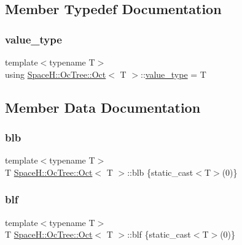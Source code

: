 \subsection{Member Typedef Documentation}
\mbox{\label{struct_space_h_1_1_oc_tree_1_1_oct_a41cf6a021264a323ca727e1a261202d7}} 
\subsubsection{\texorpdfstring{value\+\_\+type}{value\_type}}
{\footnotesize\ttfamily template$<$typename T$>$ \\
using \mbox{\hyperlink{struct_space_h_1_1_oc_tree_1_1_oct}{Space\+H\+::\+Oc\+Tree\+::\+Oct}}$<$ T $>$\+::\mbox{\hyperlink{struct_space_h_1_1_oc_tree_1_1_oct_a41cf6a021264a323ca727e1a261202d7}{value\+\_\+type}} =  T}



\subsection{Member Data Documentation}
\mbox{\label{struct_space_h_1_1_oc_tree_1_1_oct_a5686b8a8af2a730540161b5df01e9fd8}} 
\subsubsection{\texorpdfstring{blb}{blb}}
{\footnotesize\ttfamily template$<$typename T$>$ \\
T \mbox{\hyperlink{struct_space_h_1_1_oc_tree_1_1_oct}{Space\+H\+::\+Oc\+Tree\+::\+Oct}}$<$ T $>$\+::blb \{static\+\_\+cast$<$T$>$(0)\}}

\mbox{\label{struct_space_h_1_1_oc_tree_1_1_oct_a2b98879ab115598ed5e31dbad59de76a}} 
\subsubsection{\texorpdfstring{blf}{blf}}
{\footnotesize\ttfamily template$<$typename T$>$ \\
T \mbox{\hyperlink{struct_space_h_1_1_oc_tree_1_1_oct}{Space\+H\+::\+Oc\+Tree\+::\+Oct}}$<$ T $>$\+::blf \{static\+\_\+cast$<$T$>$(0)\}}

